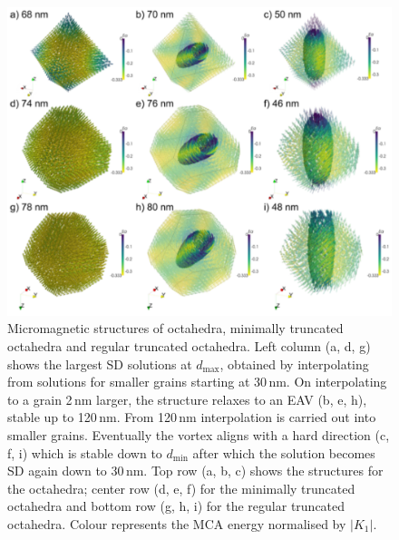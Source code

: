 \documentclass[review]{elsarticle}
\newcommand{\dmax}{d_\text{max}}
\newcommand{\dmin}{d_\text{min}}
\begin{document}
\allowdisplaybreaks

\begin{figure}[ht]
\centering
\includegraphics[width=\textwidth]{Figure_04.pdf}
\caption{Micromagnetic structures of octahedra, minimally truncated octahedra and regular truncated octahedra. Left column (a, d, g) shows the largest SD solutions at $\dmax$, obtained by interpolating from solutions for smaller grains starting at 30$\,\text{nm}$. On interpolating to a grain 2$\,\text{nm}$ larger, the structure relaxes to an EAV (b, e, h), stable up to 120$\,\text{nm}$. From 120$\,\text{nm}$ interpolation is carried out into smaller grains. Eventually the vortex aligns with a hard direction (c, f, i) which is stable down to $\dmin$ after which the solution becomes SD again down to 30$\,\text{nm}$. Top row (a, b, c) shows the structures for the octahedra; center row (d, e, f) for the minimally truncated octahedra and bottom row (g, h, i) for the regular truncated octahedra. Colour represents the MCA energy normalised by $|K_1|$.}
\label{fig4}
\end{figure}
\end{document}
